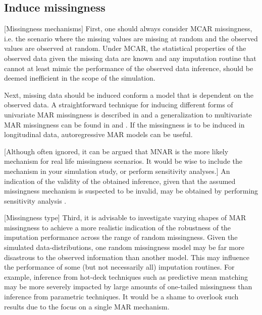 \documentclass[bimj,fleqn]{w-art}
\theoremstyle{plain}
\theoremstyle{definition}
\begin{document}

\subsection{Induce missingness}


[Missingness mechanisms]
First, one should always consider MCAR missingness, i.e. the scenario where the missing values are missing at random and the observed values are observed at random. Under MCAR, the statistical properties of the observed data given the missing data are known and any imputation routine that cannot at least mimic the performance of the observed data inference, should be deemed inefficient in the scope of the simulation. 

Next, missing data should be induced conform a model that is dependent on the observed data. A straightforward technique for inducing different forms of univariate MAR missingness is described in \citet[][p. 63]{fimd} and a generalization to multivariate MAR missingness can be found in \citet[][Appendix B]{buur06} and \citet[][\S 5.2.3]{brand1999development}. If the missingness is to be induced in longitudinal data, autoregressive MAR models \citep[e.g. cf.][model 2 and model 3]{shara2015randomly} can be useful.

[Although often ignored, it can be argued that MNAR is the more likely mechanism for real life missingness scenarios. It would be wise to include the mechanism in your simulation study, or perform sensitivity analyses.] An indication of the validity of the obtained inference, given that the assumed missingness mechanism is suspected to be invalid, may be obtained by performing sensitivity analysis \citep[see e.g.][part 5]{molenberghs2014handbook}.

[Missingness type]
Third, it is advisable to investigate varying shapes of MAR missingness to achieve a more realistic indication of the robustness of the imputation performance across the range of random missingness. Given the simulated data-distributions, one random missingness model may be far more disastrous to the observed information than another model. This may influence the performance of some (but not necessarily all) imputation routines. For example, inference from hot-deck techniques such as predictive mean matching \citep{little1988missing, rubin1986statistical} may be more severely impacted by large amounts of one-tailed missingness than inference from parametric techniques. It would be a shame to overlook such results due to the focus on a single MAR mechanism. 
\end{document}
